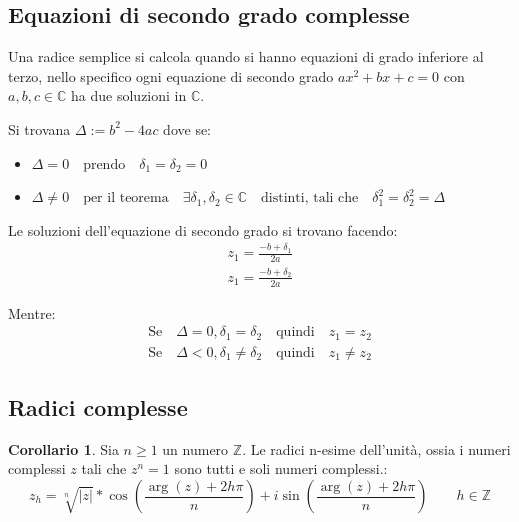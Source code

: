 \documentclass{article}
\theoremstyle{definition}
\newtheorem{corollario}{Corollario}[section]
\begin{document}
\subsection{Equazioni di secondo grado complesse}\label{equazioni_di_secondo_grado_complesse}
Una radice semplice si calcola quando si hanno equazioni di grado inferiore al terzo, nello specifico ogni equazione di secondo grado $ax^2+bx+c = 0$ con $a,b,c \in \mathbb{C}$ ha due soluzioni in $\mathbb{C}$. \par
Si trovana $\Delta := b^2 - 4ac$ dove se:
\begin{itemize}
        \item $\Delta = 0 \quad \mbox{prendo} \quad \delta_1 = \delta_2 = 0$	
        \item $\Delta \not = 0 \quad \mbox{per il teorema} \quad \exists \delta_1,\delta_2 \in \mathbb{C} \quad \mbox{distinti, tali che} \quad \delta_1^2 = \delta_2^2 = \Delta$	
\end{itemize}

Le soluzioni dell'equazione di secondo grado si trovano facendo:
\begin{align*}
        z_1 = \frac{-b + \delta_1}{2a} \\
        z_1 = \frac{-b + \delta_2}{2a} 
\end{align*}

Mentre:
\begin{align*}
        \mbox{Se} \quad \Delta = 0, \delta_1=\delta_2 \quad \mbox{quindi} \quad z_1=z_2 \\
        \mbox{Se} \quad \Delta < 0, \delta_1 \not = \delta_2 \quad \mbox{quindi} \quad z_1 \not = z_2 
\end{align*}



\subsection{Radici complesse}\label{sec:radici_complesse}
\begin{tcolorbox}
        \begin{corollario}
               Sia $ n \ge 1 $ un numero $ \mathbb{Z}  $. Le radici n-esime dell'unità, ossia i numeri complessi $ z $ tali che $ z^n = 1 $ sono tutti e soli numeri complessi.:
               \begin{equation*}
                       z_h = \sqrt[n]{|z|} * \cos(\frac{\arg(z) + 2h\pi}{n}) + i\sin(\frac{\arg(z) + 2h\pi}{n}) \quad \quad h \in \mathbb{Z}
               \end{equation*}
        \end{corollario}
\end{tcolorbox}
\end{document}
